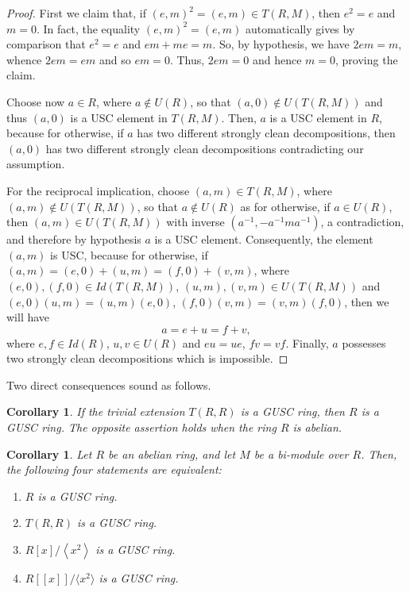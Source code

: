 \documentclass[12pt]{amsart}
\newtheorem{corollary}[theorem]{Corollary}
\theoremstyle{definition}
\begin{document}
\begin{proof}
First we claim that, if $(e,m)^{2}=(e,m)\in T(R,M)$, then $e^{2}=e$ and $m=0$. In fact, the equality $(e,m)^{2}=(e,m)$ automatically gives by comparison that $e^{2}=e$ and $em+me=m$. So, by hypothesis, we have $2em=m$, whence $2em=em$ and so $em=0$. Thus, $2em=0$ and hence $m=0$, proving the claim.
	
Choose now $a\in R$, where $a\not\in U(R)$, so that $(a,0)\notin U(T(R,M))$ and thus $(a,0)$ is a USC element in $T(R,M)$. Then, $a$ is a USC element in $R$, because for otherwise, if $a$ has two different strongly clean decompositions, then $(a,0)$ has two different strongly clean decompositions contradicting our assumption.

For the reciprocal implication, choose $(a,m)\in T(R,M)$, where $(a,m)\notin U(T(R,M))$, so that $a\not\in U(R)$ as for otherwise, if $a\in U(R)$, then $(a,m)\in U(T(R,M))$ with inverse $(a^{-1},-a^{-1}ma^{-1})$, a contradiction, and therefore by hypothesis $a$ is a USC element. Consequently, the element $(a,m)$ is USC, because for otherwise, if $(a,m)=(e,0)+(u,m)=(f,0)+(v,m)$, where $(e,0), (f,0)\in Id(T(R,M))$, $(u,m),(v,m)\in U(T(R,M))$ and
$(e,0)(u,m)=(u,m)(e,0)$, $(f,0)(v,m)=(v,m)(f,0)$, then we will have $$a=e+u=f+v,$$ where $e,f\in Id(R)$, $u,v\in U(R)$ and $eu=ue$, $fv=vf$. Finally, $a$ possesses two strongly clean decompositions which is impossible.
\end{proof}

Two direct consequences sound as follows.

\begin{corollary}
If the trivial extension $T(R,R)$ is a GUSC ring, then $R$ is a GUSC ring. The opposite assertion holds when the ring $R$ is abelian.
\end{corollary}

\begin{corollary}
Let $R$ be an abelian ring, and let $M$ be a bi-module over $R$. Then, the following four statements are equivalent:
\begin{enumerate}
\item
$R$ is a GUSC ring.
\item
$T(R, R)$ is a GUSC ring.
\item
$R[x]/\left\langle x^2 \right\rangle$ is a GUSC ring.
\item
$R[[x]]/\langle x^2\rangle$ is a GUSC ring.
\end{enumerate}
\end{corollary}
\end{document}
